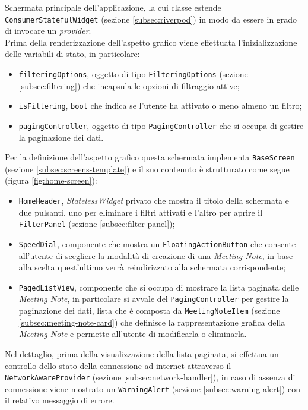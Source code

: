 Schermata principale dell'applicazione, la cui classe estende \lstinline{ConsumerStatefulWidget} (sezione \ref{subsec:riverpod}) in modo da essere in grado di invocare un \emph{provider}. \\
Prima della renderizzazione dell'aspetto grafico viene effettuata l'inizializzazione delle variabili di stato, in particolare:
\begin{itemize}
    \item \lstinline{filteringOptions}, oggetto di tipo \lstinline{FilteringOptions} (sezione \ref{subsec:filtering}) che incapsula le opzioni di filtraggio attive;
    \item \lstinline{isFiltering}, \lstinline{bool} che indica se l'utente ha attivato o meno almeno un filtro;
    \item \lstinline{pagingController}, oggetto di tipo \lstinline{PagingController}\cite{site:infinite-scroll-pagination} che si occupa di gestire la paginazione dei dati.
\end{itemize}
Per la definizione dell'aspetto grafico questa schermata implementa \lstinline{BaseScreen} (sezione \ref{subsec:screens-template}) e il suo contenuto è strutturato come segue (figura \ref{fig:home-screen}):
\begin{itemize}
    \item \lstinline{HomeHeader}, \emph{StatelessWidget} privato che mostra il titolo della schermata e due pulsanti, uno per eliminare i filtri attivati e l'altro per aprire il \lstinline{FilterPanel} (sezione \ref{subsec:filter-panel});
    \item \lstinline{SpeedDial}, componente che mostra un \lstinline{FloatingActionButton}\cite{site:fab} che consente all'utente di scegliere la modalità di creazione di una \emph{Meeting Note}, in base alla scelta quest'ultimo verrà reindirizzato alla schermata corrispondente;
    \item \lstinline{PagedListView}\cite{site:infinite-scroll-pagination}, componente che si occupa di mostrare la lista paginata delle \emph{Meeting Note}, in particolare si avvale del \lstinline{PagingController} per gestire la paginazione dei dati, lista che è composta da \lstinline{MeetingNoteItem} (sezione \ref{subsec:meeting-note-card}) che definisce la rappresentazione grafica della \emph{Meeting Note} e permette all'utente di modificarla o eliminarla.
\end{itemize}
Nel dettaglio, prima della visualizzazione della lista paginata, si effettua un controllo dello stato della connessione ad internet attraverso il \lstinline{NetworkAwareProvider} (sezione \ref{subsec:network-handler}), in caso di assenza di connessione viene mostrato un \lstinline{WarningAlert} (sezione \ref{subsec:warning-alert}) con il relativo messaggio di errore. \\
